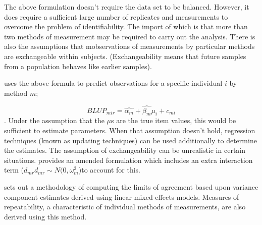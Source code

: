 \documentclass{report}
\begin{document}
The above formulation doesn't require the data set to be balanced.
However, it does require a sufficient large number of replicates
and measurements to overcome the problem of identifiability. The
import of which is that more than two methods of measurement may
be required to carry out the analysis. There is also the
assumptions that mobservations of measurements by particular
methods are exchangeable within subjects. (Exchangeability means
that future samples from a population behaves like earlier
samples).


\citet{BXC2004} uses the above formula to predict observations for
a specific individual $i$ by method $m$;

\begin{equation}BLUP_{mir} = \hat{\alpha_{m}} + \hat{\beta_{m}}\mu_{i} +
	c_{mi} \end{equation}. Under the assumption that the $\mu$s are
the true item values, this would be sufficient to estimate
parameters. When that assumption doesn't hold, regression techniques (known as updating techniques)
can be used additionally to determine the estimates.
The assumption of exchangeability can be unrealistic in certain situations.
\citet{BXC2004} provides an amended formulation which includes an extra interaction
term ($d_{mr} d_{mr} \sim N(0,\omega^{2}_{m}$)to account for this.

\citet{BXC2008} sets out a methodology of computing the limits of
agreement based upon variance component estimates derived using
linear mixed effects models. Measures of repeatability, a
characteristic of individual methods of measurements, are also
derived using this method.
\end{document}
